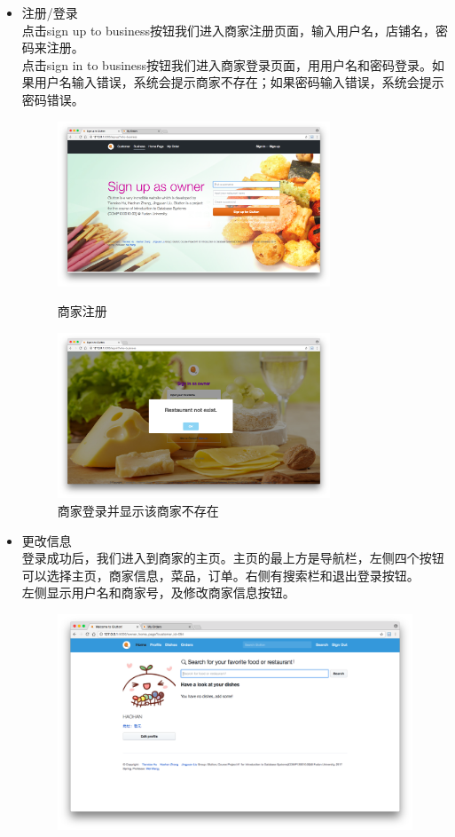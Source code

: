 \documentclass[12pt, oneside,a4paper]{article}
\begin{document}
  \begin{itemize}
  \item 注册/登录\\
  点击sign up to business按钮我们进入商家注册页面，输入用户名，店铺名，密码来注册。\\
  点击sign in to business按钮我们进入商家登录页面，用用户名和密码登录。如果用户名输入错误，系统会提示商家不存在；如果密码输入错误，系统会提示密码错误。
  \begin{figure}[H]
   \begin{minipage}[t]{0.5\linewidth}
    \centering
     \includegraphics[width=3.2in]{re-signup.jpg}
     \caption{\small{商家注册}}
   \end{minipage}
   \begin{minipage}[t]{0.5\linewidth}
    \centering
     \includegraphics[width=3.2in]{re-signin.jpg}
      \caption{\small{商家登录并显示该商家不存在}}
   \end{minipage}
   \end{figure}
  \item 更改信息\\
  登录成功后，我们进入到商家的主页。主页的最上方是导航栏，左侧四个按钮可以选择主页，商家信息，菜品，订单。右侧有搜索栏和退出登录按钮。\\
  左侧显示用户名和商家号，及修改商家信息按钮。
  \begin{figure}[H]
   \centering
     \includegraphics[width=6.00in]{re-home1.jpg}

\end{figure}
\end{itemize}
\end{document}
